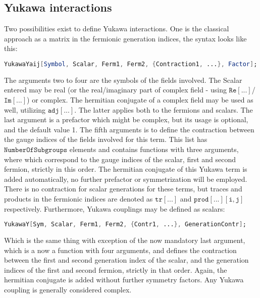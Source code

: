 \documentclass{scrartcl}
\begin{document}
\subsection{Yukawa interactions}
Two possibilities exist to define Yukawa interactions. One is the classical approach as a matrix in the fermionic generation indices, the syntax looks like this:
\begin{lstlisting}[language=mathematica,mathescape,columns=flexible,backgroundcolor=\color{light-gray}]
YukawaYaij[Symbol, Scalar, Ferm1, Ferm2, {Contraction1, ...}, Factor];
\end{lstlisting}
The arguments two to four are the symbols of the fields involved. The Scalar entered may be real (or the real/imaginary part of complex field - using $\mathtt{Re[...]}$/$\mathtt{Im[...]}$) or complex. The hermitian conjugate of a complex field may be used as well, utilizing $\mathtt{adj[...]}$. The latter applies both to the fermions and scalars. The last argument is a prefactor which might be complex, but its usage is optional, and the default value 1. The fifth arguments is to define the contraction between the gauge indices of the fields involved for this term. This list has $\mathtt{NumberOfSubgroups}$ elements and contains functions with three arguments, where which correspond to the gauge indices of the scalar, first and second fermion, strictly in this order. The hermitian conjugate of this Yukawa term is added automatically, no further prefactor or symmetrization will be employed. There is no contraction for scalar generations for these terms, but traces and products in the fermionic indices are denoted as $\mathtt{tr[...]}$ and $\mathtt{prod[...][i,j]}$ respectively.\newline 
Furthermore, Yukawa couplings may be defined as scalars:
\begin{lstlisting}[language=mathematica,mathescape,columns=flexible,backgroundcolor=\color{light-gray}]
YukawaY[Sym, Scalar, Ferm1, Ferm2, {Contr1, ...}, GenerationContr];
\end{lstlisting}
Which is the same thing with exception of the now mandatory last argument, which is a now a function with four arguments, and defines the contraction between the first and second generation index of the scalar, and the generation indices of the first and second fermion, strictly in that order. Again, the hermitian conjugate is added without further symmetry factors. Any Yukawa coupling is generally considered complex.
\FloatBarrier
\end{document}
